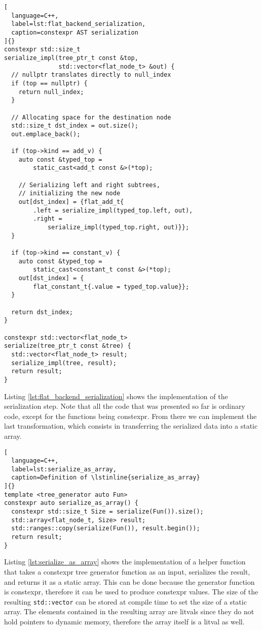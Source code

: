 \documentclass[../main]{subfiles}
\begin{document}
\begin{lstlisting}[
  language=C++,
  label=lst:flat_backend_serialization,
  caption=constexpr AST serialization
]{}
constexpr std::size_t
serialize_impl(tree_ptr_t const &top,
               std::vector<flat_node_t> &out) {
  // nullptr translates directly to null_index
  if (top == nullptr) {
    return null_index;
  }

  // Allocating space for the destination node
  std::size_t dst_index = out.size();
  out.emplace_back();

  if (top->kind == add_v) {
    auto const &typed_top =
        static_cast<add_t const &>(*top);

    // Serializing left and right subtrees,
    // initializing the new node
    out[dst_index] = {flat_add_t{
        .left = serialize_impl(typed_top.left, out),
        .right =
            serialize_impl(typed_top.right, out)}};
  }

  if (top->kind == constant_v) {
    auto const &typed_top =
        static_cast<constant_t const &>(*top);
    out[dst_index] = {
        flat_constant_t{.value = typed_top.value}};
  }

  return dst_index;
}

constexpr std::vector<flat_node_t>
serialize(tree_ptr_t const &tree) {
  std::vector<flat_node_t> result;
  serialize_impl(tree, result);
  return result;
}
\end{lstlisting}

Listing \ref{lst:flat_backend_serialization} shows the implementation of the
serialization step. Note that all the code that was presented so far
is ordinary \cpp code, except for the functions being \gls{constexpr}.
From there we can implement the last transformation, which consists
in transferring the serialized data into a static array.

\begin{lstlisting}[
  language=C++,
  label=lst:serialize_as_array,
  caption=Definition of \lstinline{serialize_as_array}
]{}
template <tree_generator auto Fun>
constexpr auto serialize_as_array() {
  constexpr std::size_t Size = serialize(Fun()).size();
  std::array<flat_node_t, Size> result;
  std::ranges::copy(serialize(Fun()), result.begin());
  return result;
}
\end{lstlisting}

Listing \ref{lst:serialize_as_array} shows the implementation of a helper
function that takes a \gls{constexpr} tree generator function as an input,
serializes the result, and returns it as a static array.
This can be done because the generator function is \gls{constexpr}, therefore it
can be used to produce \gls{constexpr} values. The size of the resulting
\lstinline{std::vector} can be stored at compile time to set the size
of a static array.
The elements contained in the resulting array are \glspl{litval} since they do
not hold pointers to dynamic memory, therefore the array itself is a
\gls{litval} as well.
\end{document}
